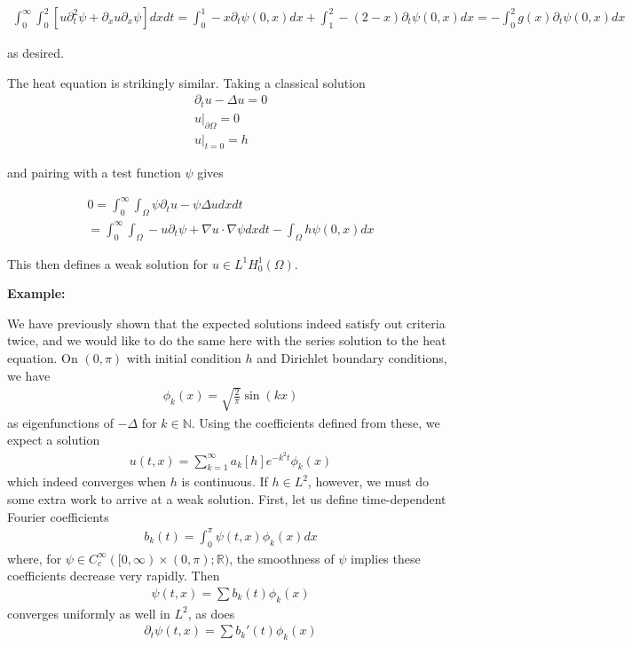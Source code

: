 \documentclass{article}
\newcommand{\N}{{\mathbb{N}}}
\newcommand{\R}{{\mathbb{R}}}
\newcommand{\pd}{\partial}
\newcommand{\CC}{C_{c}^{\infty}}
\begin{document}
	\begin{align*}
		\int_{0}^{\infty} \int_{0}^{2} \left[u \pd_{t}^{2} \psi + \pd_{x}u \pd_{x}\psi \right]dxdt =  \int_{0}^{1}  -x\pd_{t} \psi (0,x) dx + \int_{1}^{2}-(2-x)\pd_{t} \psi(0,x) dx
		= - \int_{0}^{2} g(x) \pd_{t} \psi(0,x) dx
	\end{align*}
	
	as desired. 
	
	\vspace{0.25 cm}
	
	
	The heat equation is strikingly similar. Taking a classical solution
	\begin{align*}
		\pd_{t} u - \Delta u = 0 \\
		u|_{\pd \Omega} = 0 \\
		u|_{t=0} = h
	\end{align*}
	
	and pairing with a test function $\psi$ gives
	
	\begin{align*}
		 0 = \int_{0}^{\infty} \int_{\Omega} \psi \pd_{t}u - \psi \Delta u dxdt \\
		 = \int_{0}^{\infty} \int_{\Omega} -u \pd_{t} \psi + \nabla u \cdot \nabla \psi dxdt - \int_{\Omega} h \psi(0,x) dx 
	\end{align*}
	
	This then defines a weak solution for $u \in L^{1}H^{1}_{0}(\Omega)$.
	
	\vspace{0.25 cm}
	
	\textbf{Example:}
	
	We have previously shown that the expected solutions indeed satisfy out criteria twice, and we would like to do the same here with the series solution to the heat equation. On $(0,\pi)$ with initial condition $h$ and Dirichlet boundary conditions, we have 
	\begin{align*}
		\phi_{k}(x) = \sqrt{\frac{2}{\pi}} \sin(kx)
	\end{align*}
	as eigenfunctions of $-\Delta$ for $k \in \N$. Using the coefficients defined from these, we expect a solution 
	\begin{align*}
		u(t,x) = \sum_{k=1}^{\infty} a_{k}[h] e^{-k^{2}t} \phi_{k}(x)
	\end{align*}
	which indeed converges when $h$ is continuous. If $h \in L^{2}$, however, we must do some extra work to arrive at a weak solution. First, let us define time-dependent Fourier coefficients 
	\begin{align*}
		b_{k}(t) = \int_{0}^{\pi} \psi(t,x) \phi_{k}(x) dx
	\end{align*}
	where, for $\psi \in \CC([0,\infty) \times (0,\pi); \R)$, the smoothness of $\psi$ implies these coefficients decrease very rapidly. Then
	\begin{align*}
		\psi(t,x) = \sum b_{k}(t) \phi_{k}(x)
	\end{align*}
	converges uniformly as well in $L^{2}$, as does 
	\begin{align*}
		\pd_{t} \psi (t,x) = \sum b_{k}'(t) \phi_{k}(x)
	\end{align*}
	
\end{document}
